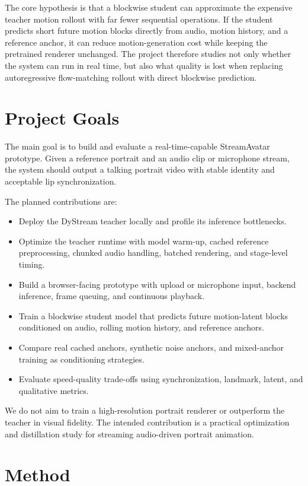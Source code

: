 \documentclass{article}
\begin{document}
The core hypothesis is that a blockwise student can approximate the expensive teacher motion rollout with far fewer sequential operations. If the student predicts short future motion blocks directly from audio, motion history, and a reference anchor, it can reduce motion-generation cost while keeping the pretrained renderer unchanged. The project therefore studies not only whether the system can run in real time, but also what quality is lost when replacing autoregressive flow-matching rollout with direct blockwise prediction.

\section{Project Goals}

The main goal is to build and evaluate a real-time-capable StreamAvatar prototype. Given a reference portrait and an audio clip or microphone stream, the system should output a talking portrait video with stable identity and acceptable lip synchronization.

The planned contributions are:
\begin{itemize}
    \item Deploy the DyStream teacher locally and profile its inference bottlenecks.
    \item Optimize the teacher runtime with model warm-up, cached reference preprocessing, chunked audio handling, batched rendering, and stage-level timing.
    \item Build a browser-facing prototype with upload or microphone input, backend inference, frame queuing, and continuous playback.
    \item Train a blockwise student model that predicts future motion-latent blocks conditioned on audio, rolling motion history, and reference anchors.
    \item Compare real cached anchors, synthetic noise anchors, and mixed-anchor training as conditioning strategies.
    \item Evaluate speed-quality trade-offs using synchronization, landmark, latent, and qualitative metrics.
\end{itemize}

We do not aim to train a high-resolution portrait renderer or outperform the teacher in visual fidelity. The intended contribution is a practical optimization and distillation study for streaming audio-driven portrait animation.

\section{Method}
\end{document}
